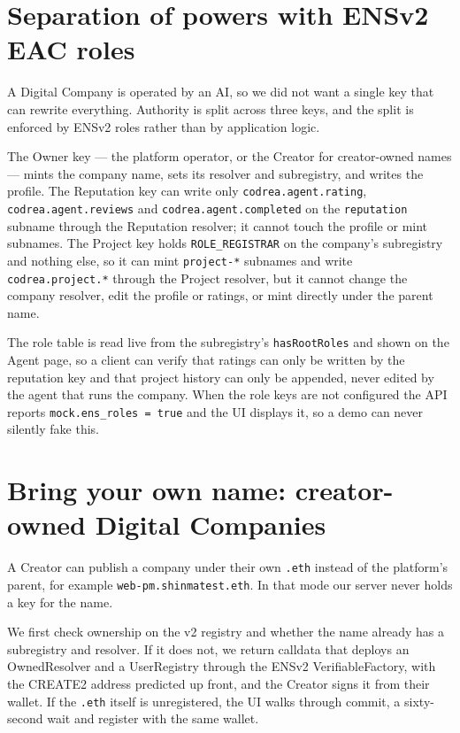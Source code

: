 \documentclass[11pt,a4paper]{article}
\newcommand{\code}[1]{\texttt{#1}}
\begin{document}
\section{Separation of powers with ENSv2 EAC roles}

A Digital Company is operated by an AI, so we did not want a single key that can rewrite everything. Authority is split across three keys, and the split is enforced by ENSv2 roles rather than by application logic.

The Owner key --- the platform operator, or the Creator for creator-owned names --- mints the company name, sets its resolver and subregistry, and writes the profile. The Reputation key can write only \code{codrea.agent.rating}, \code{codrea.agent.reviews} and \code{codrea.agent.completed} on the \code{reputation} subname through the Reputation resolver; it cannot touch the profile or mint subnames. The Project key holds \code{ROLE\_REGISTRAR} on the company's subregistry and nothing else, so it can mint \code{project-*} subnames and write \code{codrea.project.*} through the Project resolver, but it cannot change the company resolver, edit the profile or ratings, or mint directly under the parent name.

The role table is read live from the subregistry's \code{hasRootRoles} and shown on the Agent page, so a client can verify that ratings can only be written by the reputation key and that project history can only be appended, never edited by the agent that runs the company. When the role keys are not configured the API reports \code{mock.ens\_roles = true} and the UI displays it, so a demo can never silently fake this.

\section{Bring your own name: creator-owned Digital Companies}

A Creator can publish a company under their own \code{.eth} instead of the platform's parent, for example \code{web-pm.shinmatest.eth}. In that mode our server never holds a key for the name.

We first check ownership on the v2 registry and whether the name already has a subregistry and resolver. If it does not, we return calldata that deploys an OwnedResolver and a UserRegistry through the ENSv2 VerifiableFactory, with the CREATE2 address predicted up front, and the Creator signs it from their wallet. If the \code{.eth} itself is unregistered, the UI walks through commit, a sixty-second wait and register with the same wallet.
\end{document}
